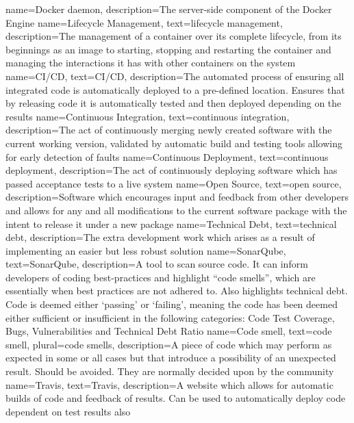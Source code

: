 {
		name={Docker daemon},
		description={The server-side component of the Docker Engine}
}
{
		name={Lifecycle Management},
    text={lifecycle management},
		description={The management of a container over its complete lifecycle, from its beginnings as an image to starting, stopping and restarting the container and managing the interactions it has with other containers on the system}
}
{
		name={CI/CD},
    text={CI/CD},
		description={The automated process of ensuring all integrated code is automatically deployed to a pre-defined location. Ensures that by releasing code it is automatically tested and then deployed depending on the results}
}
{
		name={Continuous Integration},
    text={continuous integration},
		description={The act of continuously merging newly created software with the current working version, validated by automatic build and testing tools allowing for early detection of faults}
}
{
		name={Continuous Deployment},
		text={continuous deployment},
		description={The act of continuously deploying software which has passed acceptance tests to a live system}
}
{
    name={Open Source},
    text={open source},
    description={Software which encourages input and feedback from other developers and allows for any and all modifications to the current software package with the intent to release it under a new package}
}
{
    name={Technical Debt},
    text={technical debt},
    description={The extra development work which arises as a result of implementing an easier but less robust solution}
}
{
    name={SonarQube},
    text={SonarQube},
    description={A tool to scan source code. It can inform developers of coding best-practices and highlight ``code smells'', which are essentially when best practices are not adhered to. Also highlights technical debt. Code is deemed either `passing' or `failing', meaning the code has been deemed either sufficient or insufficient in the following categories: Code Test Coverage, Bugs, Vulnerabilities and Technical Debt Ratio}
}
{
    name={Code smell},
    text={code smell},
    plural={code smells},
    description={A piece of code which may perform as expected in some or all cases but that introduce a possibility of an unexpected result. Should be avoided. They are normally decided upon by the community}
}
{
    name={Travis},
    text={Travis},
    description={A website which allows for automatic builds of code and feedback of results. Can be used to automatically deploy code dependent on test results also}
}
